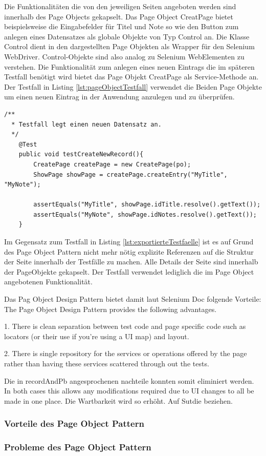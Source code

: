 Die Funktionalitäten die von den jeweiligen Seiten angeboten werden sind innerhalb des Page Objects gekapselt. Das Page Object CreatPage bietet beispielsweise die Eingabefelder für Titel und Note so wie den Button zum anlegen eines Datensatzes als globale Objekte von Typ Control an.
Die Klasse Control dient in den dargestellten Page Objekten als Wrapper für den Selenium WebDriver. Control-Objekte sind also analog zu Selenium WebElementen zu verstehen.
Die Funktionalität zum anlegen eines neuen Eintrags die im späteren Testfall benötigt wird bietet das Page Objekt CreatPage als Service-Methode an.\\

Der Testfall in Listing \ref{lst:pageObjectTestfall} verwendet die Beiden Page Objekte um einen neuen Eintrag in der Anwendung anzulegen und zu überprüfen.


\begin{lstlisting}[caption={Page Object Testfall},label={lst:pageObjectTestfall}]  
  /**
  * Testfall legt einen neuen Datensatz an.
  */
 	@Test
	public void testCreateNewRecord(){
		CreatePage createPage = new CreatePage(po);
		ShowPage showPage = createPage.createEntry("MyTitle", "MyNote");

		assertEquals("MyTitle", showPage.idTitle.resolve().getText());
		assertEquals("MyNote", showPage.idNotes.resolve().getText());
	}

\end{lstlisting}

Im Gegensatz zum Testfall in Listing \ref{lst:exportierteTestfaelle} ist es auf Grund des Page Object Pattern nicht mehr nötig explizite Referenzen auf die Struktur der Seite innerhalb der Testfälle zu machen. Alle Details der Seite sind innerhalb der PageObjekte gekapselt. Der Testfall verwendet lediglich die im Page Object angebotenen Funktionalität.

Das Pag Object Design Pattern bietet damit laut Selenium Doc folgende Vorteile:
The Page Object Design Pattern provides the following advantages.

1. There is clean separation between test code and page specific code such as locators (or their use if you’re using a UI map) and layout.

2. There is single repository for the services or operations offered by the page rather than having these services scattered through out the tests.

Die in recordAndPb angesprochenen nachteile konnten somit eliminiert werden.
In both cases this allows any modifications required due to UI changes to all be made in one place. Die Wartbarkeit wird so erhöht. Auf Sutdie beziehen.
\subsubsection{Vorteile des Page Object Pattern}
\label{sec:vorteile_des_page_object_pattern}

\subsubsection{Probleme des Page Object Pattern}
\label{sec:probleme_des_page_object_pattern}



